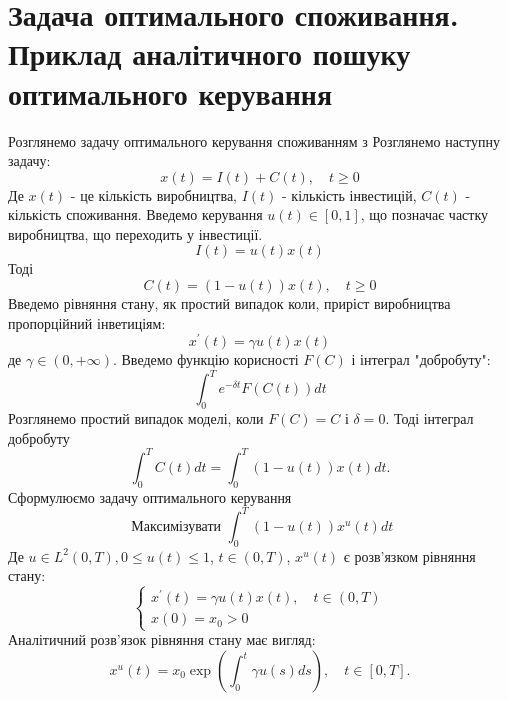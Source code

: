 \documentclass[a4paper,12pt]{extreport}
\begin{document}
\section{Задача оптимального споживання. Приклад аналітичного пошуку оптимального керування}
Розглянемо задачу оптимального керування споживанням з \cite{3}
Розглянемо наступну задачу:
\begin{equation} \label{eq:4_1}
x(t)=I(t)+C(t), \quad t \geq 0
\end{equation}
Де $x(t)$ - це кількість виробництва, $I(t)$ - кількість інвестицій, $C(t)$ - кількість споживання. 
Введемо керування $u(t) \in[0,1]$, що позначає частку виробництва, що переходить у інвестиції.
\begin{equation} \label{eq:4_2}
I(t)=u(t) x(t)
\end{equation}
Тоді 
\begin{equation} \label{eq:4_3}
C(t)=(1-u(t)) x(t), \quad t \geq 0
\end{equation}
Введемо рівняння стану, як простий випадок коли, приріст виробництва пропорційний інветиціям:
\begin{equation} \label{eq:4_4}
x^{\prime}(t)=\gamma u(t) x(t)
\end{equation}
де $\gamma \in(0,+\infty)$.
Введемо функцію корисності $F(C)$ і інтеграл "добробуту":
\begin{equation} \label{eq:4_5}
\int_0^T e^{-\delta t} F(C(t)) d t
\end{equation}
Розглянемо простий випадок моделі, коли $F(C)=C \text { і } \delta=0$.
Тоді інтеграл добробуту 
\begin{equation} \label{eq:4_6}
\int_0^T C(t) d t=\int_0^T(1-u(t)) x(t) d t .
\end{equation}
Сформулюємо задачу оптимального керування
\begin{equation} \label{eq:4_7}
\text { Максимізувати } \int_0^T(1-u(t)) x^u(t) d t
\end{equation}
Де $u \in L^2(0, T), 0 \leq u(t) \leq 1$, $t \in(0, T)$, $x^u(t)$ є розв'язком рівняння стану:
\begin{equation} \label{eq:4_8}
\left\{\begin{array}{l}
x^{\prime}(t)=\gamma u(t) x(t), \quad t \in(0, T) \\
x(0)=x_0>0
\end{array}\right.
\end{equation}
Аналітичний розв'язок рівняння стану має вигляд:
\begin{equation} \label{eq:4_9}
x^u(t)=x_0 \exp \left(\int_0^t \gamma u(s) d s\right), \quad t \in[0, T] .
\end{equation}
\end{document}
